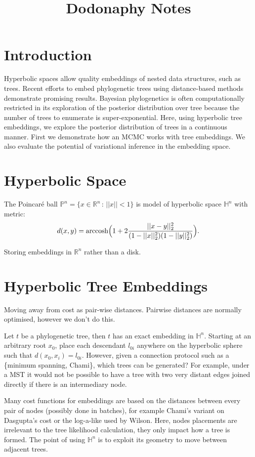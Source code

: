 \documentclass[11pt]{article}
\title{Dodonaphy Notes}
\begin{document}
\maketitle
\section{Introduction}
Hyperbolic spaces allow quality embeddings of nested data structures, such as trees.
Recent efforts to embed phylogenetic trees using distance-based methods demonstrate promising results.
Bayesian phylogenetics is often computationally restricted in its exploration of the posterior distribution over tree because the number of trees to enumerate is super-exponential.
Here, using hyperbolic tree embeddings, we explore the posterior distribution of trees in a continuous manner.
First we demonstrate how an MCMC works with tree embeddings.
We also evaluate the potential of variational inference in the embedding space.

\section{Hyperbolic Space}
The Poincaré ball $\mathbb{P}^{n} = \{x\in \mathbb{R}^{n} \,:\, ||x||<1\}$ is model of hyperbolic space $\mathbb{H}^{n}$ with metric:
\begin{equation*}
d(x,y) = \textnormal{arccosh}\Big(1 + 2 \frac{||x-y||_{2}^{2}}{ (1-||x||_{2}^{2}) (1-||y||_{2}^{2})}\Big).
\end{equation*}

Storing embeddings in $\mathbb{R}^{n}$ rather than a disk.

\section{Hyperbolic Tree Embeddings}
Moving away from cost as pair-wise distances.
Pairwise distances are normally optimised, however we don't do this.


Let $t$ be a phylogenetic tree, then $t$ has an exact embedding in $\mathbb{H}^{n}$. Starting at an arbitrary root $x_{0}$, place each descendant $l_{0i}$ anywhere on the hyperbolic sphere such that $d(x_{0}, x_{i}) = l_{0i}$. However, given a connection protocol such as a \{minimum spanning, Chami\}, which trees can be generated? For example, under a MST it would not be possible to have a tree with two very distant edges joined directly if there is an intermediary node. 

Many cost functions for embeddings are based on the distances between every pair of nodes (possibly done in batches), for example Chami's variant on Dasgupta's cost or the log-a-like used by Wilson. Here, nodes placements are irrelevant to the tree likelihood calculation, they only impact how a tree is formed. The point of using $\mathbb{H}^{n}$ is to exploit its geometry to move between adjacent trees.
\end{document}

